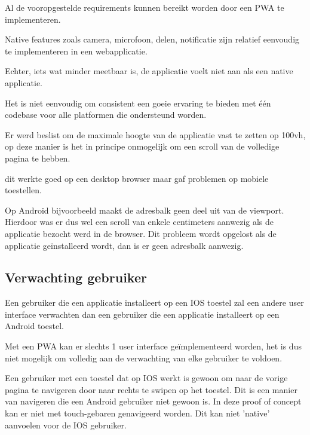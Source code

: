 Al de vooropgestelde requirements kunnen bereikt worden door een PWA te implementeren. 
	
	Native features zoals camera, microfoon, delen, notificatie zijn relatief eenvoudig te implementeren in een webapplicatie.
	
	Echter, iets wat minder meetbaar is, de applicatie voelt niet aan als een native applicatie.
	
	Het is niet eenvoudig om consistent een goeie ervaring te bieden met één codebase voor alle platformen die ondersteund worden. 
	
	Er werd beslist om de maximale hoogte van de applicatie vast te zetten op 100vh,  op deze manier is het in principe onmogelijk om een scroll van de volledige pagina te hebben. 
	
	dit werkte goed op een desktop browser maar gaf problemen op mobiele toestellen.
	
	Op Android bijvoorbeeld maakt de adresbalk geen deel uit van de viewport. Hierdoor was er dus wel een scroll van enkele centimeters aanwezig als de applicatie bezocht werd in de browser. Dit probleem wordt opgelost als de applicatie geïnstalleerd wordt, dan is er geen adresbalk aanwezig.
	
	\subsection{Verwachting gebruiker}
		Een gebruiker die een applicatie installeert op een IOS toestel zal een andere user interface verwachten dan een gebruiker die een applicatie installeert op een Android toestel.
		
		Met een PWA kan er slechts 1 user interface geïmplementeerd worden, het is dus niet mogelijk om volledig aan de verwachting van elke gebruiker te voldoen.
		
		Een gebruiker met een toestel dat op IOS werkt is gewoon om naar de vorige pagina te navigeren door naar rechts te swipen op het toestel. Dit is een manier van navigeren die een Android gebruiker niet gewoon is. In deze proof of concept kan er niet met touch-gebaren genavigeerd worden. Dit kan niet 'native' aanvoelen voor de IOS gebruiker. 
	
	
	
	
			
		